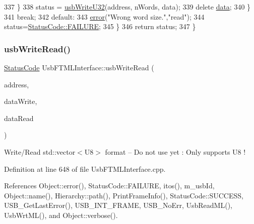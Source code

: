 \begin{DoxyCode}
337       \}
338       status = \hyperlink{classUsbFTMLInterface_a79433fc9a3dd8c96519960cd55958fbf}{usbWriteU32}(address, nWords, data);
339       \textcolor{keyword}{delete} \hyperlink{namespaceshell_a5ea2525995cedc3efd69ea8a7f034d1e}{data};
340     \}
341     \textcolor{keywordflow}{break};
342   \textcolor{keywordflow}{default}:
343     \hyperlink{classObject_a204a95f57818c0f811933917a30eff45}{error}(\textcolor{stringliteral}{"Wrong word size."},\textcolor{stringliteral}{"read"});
344     status=\hyperlink{classStatusCode_a6f565cbeadc76d14c72f047e5e85eb4ba3da73d4c469762eb9d3c960368252b26}{StatusCode::FAILURE};
345   \}
346   \textcolor{keywordflow}{return} status;
347 \}
\end{DoxyCode}
\mbox{\label{classUsbFTMLInterface_ab3ae56cb732cbb8f38494cd3205a2650}} 
\subsubsection{\texorpdfstring{usb\+Write\+Read()}{usbWriteRead()}}
{\footnotesize\ttfamily \hyperlink{classStatusCode}{Status\+Code} Usb\+F\+T\+M\+L\+Interface\+::usb\+Write\+Read (\begin{DoxyParamCaption}\item[{unsigned long int}]{address,  }\item[{std\+::vector$<$ \hyperlink{classUsbFTMLInterface_af7c9f02ee6f59fefa68ef14f90dcbbd8}{U8} $>$}]{data\+Write,  }\item[{std\+::vector$<$ \hyperlink{classUsbFTMLInterface_af7c9f02ee6f59fefa68ef14f90dcbbd8}{U8} $>$ \&}]{data\+Read }\end{DoxyParamCaption})}

Write/\+Read std\+::vector$<$\+U8$>$ format -- Do not use yet \+: Only supports U8 ! 

Definition at line 648 of file Usb\+F\+T\+M\+L\+Interface.\+cpp.



References Object\+::error(), Status\+Code\+::\+F\+A\+I\+L\+U\+RE, itos(), m\+\_\+usb\+Id, Object\+::name(), Hierarchy\+::path(), Print\+Frame\+Info(), Status\+Code\+::\+S\+U\+C\+C\+E\+SS, U\+S\+B\+\_\+\+Get\+Last\+Error(), U\+S\+B\+\_\+\+I\+N\+T\+\_\+\+F\+R\+A\+ME, U\+S\+B\+\_\+\+No\+Err, Usb\+Read\+M\+L(), Usb\+Wrt\+M\+L(), and Object\+::verbose().



